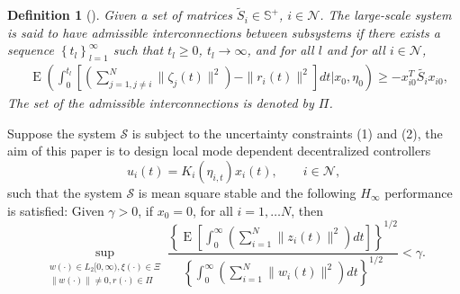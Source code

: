\documentclass[11pt,draftcls,onecolumn]{IEEEtran}
\DeclareMathOperator{\E}{E}
\newcommand{\set}[1]{\left\{#1\right\}}
\newtheorem{definition}{Definition}
\begin{document}
\begin{definition}
[\cite{Xiong2009}] Given a set of matrices $\tilde{S}_{i}\in\mathbb{S}^{+}$, $i\in\mathcal{N}$.
  The large-scale system is said to have admissible
  interconnections between subsystems if there exists a sequence
  $\set{t_{l}}_{l=1}^{\infty}$ such that $t_{l}\ge0$, $t_{l}\to\infty$, and
  for all $l$ and for all $i\in\mathcal{N}$,
\label{definition for interconnections}
\begin{align}
&\E\left(\int_0^{t_l}\left[\left(\sum_{j=1,j\neq i}^{N}\|\zeta_j(t)\|^2\right)-\|r_i(t)\|^2\right]dt|x_0,\eta_0\right)  \geq -x_{i0}^{T}\tilde{S_i}x_{i0},
\end{align}
The set of the admissible interconnections is denoted by $\Pi$.
\end{definition}



Suppose the system $\mathcal{S}$ is subject to the uncertainty constraints (1) and (2), the aim of this paper is to design local mode dependent decentralized controllers
\begin{equation}
u_i(t)=K_i(\eta_{i,t})x_i(t),  \quad\quad i \in \mathcal{N},
\end{equation}
such that the system $\mathcal{S}$ is mean square stable and  the
following $H_\infty$ performance is satisfied: Given $\gamma>0$, if $x_0=0$,   for all
$i=1,\ldots N$,  then
\begin{equation}
\sup_{\substack{w(\cdot) \in L_2[0,\infty),\xi(\cdot)\in \Xi  \\  \|w(\cdot)\|\neq 0, r(\cdot) \in \Pi}} \frac{\left\{\E\left[ \int_0^{\infty}(\sum_{i=1}^{N}\|z_i(t)\|^2) dt\right]\right\}^{1/2}}{\left\{\int_0^{\infty}(\sum_{i=1}^{N}\|w_i(t)\|^2) dt\right\}^{1/2}}<\gamma .
\end{equation}
\end{document}
